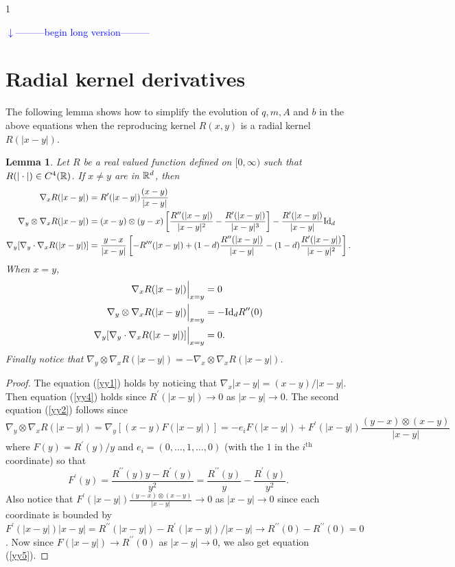\documentclass[noinfoline]{imsart}
\newtheorem{lemma}{Lemma}
\def\Ver{1}
\def\LongVer{1}
\begin{document}
\if\Ver\LongVer{ 
{\flushleft\textcolor{blue}{$\downarrow$---------begin long version---------}}\newline
\section{Radial kernel derivatives}
The following lemma shows how to simplify the evolution of $q,m, A$ and $b$ in the above equations when the reproducing kernel $R(x,y)$ is a radial kernel $R(|x-y|)$.
\begin{lemma}
Let $R$ be a real valued function defined on $[0,\infty)$ such that  $R(|\cdot|)\in C^4(\Bbb R)$. If $x\neq y$ are in $\Bbb R^d$, then
\begin{align}
\nabla_x R(|x-y|)&=R^\prime(|x-y|)\frac{(x-y)}{|x-y|} \label{yy1}\\
\nabla_y \otimes \nabla_x R(|x-y|)&=(x-y)\otimes (y-x) \left[ \frac{R^{\prime\prime}(|x-y|)}{|x-y|^2}  -  \frac{R^{\prime}(|x-y|)}{|x-y|^3} \right]  - \frac{R^{\prime}(|x-y|) }{|x-y|} \text{\rm Id}_d  \label{yy2} \\
\nabla_{y} [\nabla_y \cdot \nabla_x R(|x-y|)]&= \frac{y-x}{|x-y|}\left[-R^{\prime\prime\prime}(|x-y|)+ (1-d)\frac{R^{\prime\prime}(|x-y|)}{|x-y|} -   (1-d)\frac{R^{\prime}(|x-y|)}{|x-y|^2}  \right].  \label{yy3}
\end{align}
When $x=y$,
\begin{align}
\nabla_x R(|x-y|)\Bigr|_{x=y}&=0   \label{yy4}\\
\nabla_y \otimes \nabla_x R(|x-y|)\Bigr|_{x=y}&= -\text{\rm Id}_d  R^{\prime\prime}(0)  \label{yy5}\\
\nabla_{y} [\nabla_y \cdot \nabla_x R(|x-y|)]\Bigr|_{x=y}&=0.    \label{yy6}
\end{align}
Finally notice that $\nabla_y \otimes \nabla_x R(|x-y|)=-\nabla_x \otimes \nabla_x R(|x-y|)$.
\end{lemma}

\begin{proof}
The equation (\ref{yy1}) holds by noticing that $\nabla_x |x-y|= (x-y)/|x-y|$. Then equation  (\ref{yy4}) holds since $R^{\prime}(|x-y|)\rightarrow 0$ as $|x-y|\rightarrow 0$. The second equation (\ref{yy2}) follows since
\[ \nabla_y \otimes \nabla_x R(|x-y|)=  \nabla_y  [(x-y) F(|x-y|)]=-e_i F(|x-y|)+ F^\prime(|x-y|) \frac{(y-x)\otimes (x-y)}{|x-y|}\]
where $F(y)=R^\prime(y)/y$ and $e_i=(0,\ldots,1,\ldots,0)$ (with the $1$ in the $i^\text{th}$ coordinate) so that
\[ F^\prime(y)=\frac{R^{\prime\prime}(y)y- R^{\prime}(y)}{y^2} =\frac{R^{\prime\prime}(y)}{y}-\frac{ R^{\prime}(y)}{y^2}.\]
Also notice that $ F^\prime(|x-y|) \frac{(y-x)\otimes (x-y)}{|x-y|}\rightarrow 0$ as $|x-y|\rightarrow 0$ since each coordinate is bounded by $F^\prime(|x-y|) |x-y|= R^{\prime\prime}(|x-y|)- R^\prime(|x-y|)/|x-y|\rightarrow R^{\prime\prime}(0)- R^{\prime\prime}(0)=0$. Now since $F(|x-y|)\rightarrow R^{\prime\prime}(0)$ as $|x-y|\rightarrow 0$, we also get equation (\ref{yy5}).



\end{proof}}
\end{document}
